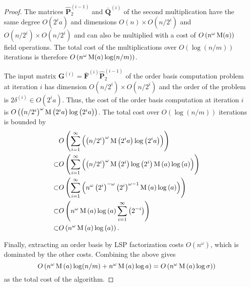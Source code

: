 \begin{proof}
The matrices $\hat{\mathbf{P}}_{2}^{\left(i-1\right)}$ and $\bar{\mathbf{Q}}^{\left(i\right)}$
of the second multiplication have the same degree $O(2^{i}a)$ and
dimensions $O\left(n\right)\times O(n/2^{i})$ and $O(n/2^{i})\times O(n/2^{i})$
and can also be multiplied with a cost of $O\left(n^{\omega}\M(a)\right)$
field operations. The total cost of the multiplications over $O(\log\left(n/m\right))$
iterations is therefore $O\left(n^{\omega}\M(a)\log(n/m)\right)$.

The input matrix $\mathbf{G}^{\left(i\right)}=\bar{\mathbf{F}}^{\left(i\right)}\hat{\mathbf{P}}_{2}^{\left(i-1\right)}$
of the order basis computation problem at iteration $i$ has dimension
$O(n/2^{i})\times O(n/2^{i})$ and the order of the problem is $2\delta^{\left(i\right)}\in O(2^{i}a)$.
Thus, the cost of the order basis computation at iteration $i$ is
$O\left(\left(n/2^{i}\right)^{\omega}\M\left(2^{i}a\right)\log\left(2^{i}a\right)\right)$.
The total cost over $O(\log\left(n/m\right))$ iterations is bounded
by 
\begin{align*}
 & O\left(\sum_{i=1}^{\infty}\left(\left(n/2^{i}\right)^{\omega}\M\left(2^{i}a\right)\log\left(2^{i}a\right)\right)\right)\\
\subset & O\left(\sum_{i=1}^{\infty}\left(\left(n/2^{i}\right)^{\omega}\M\left(2^{i}\right)\log\left(2^{i}\right)\M\left(a\right)\log\left(a\right)\right)\right)\\
\subset & O\left(\sum_{i=1}^{\infty}\left(n^{\omega}\left(2^{i}\right)^{-\omega}\left(2^{i}\right)^{\omega-1}\M\left(a\right)\log\left(a\right)\right)\right)\\
\subset & O\left(n^{\omega}\M\left(a\right)\log\left(a\right)\sum_{i=1}^{\infty}\left(2^{-i}\right)\right)\\
\subset & O\left(n^{\omega}\M\left(a\right)\log\left(a\right)\right).
\end{align*}


Finally, extracting an order basis by LSP factorization costs $O\left(n^{\omega}\right)$,
which is dominated by the other costs. Combining the above gives 
\[
O\left(n^{\omega}\M\left(a\right)\log(n/m)+n^{\omega}\M\left(a\right)\log a\right)=O\left(n^{\omega}\M\left(a\right)\log\sigma)\right)
\]
 as the total cost of the algorithm. \end{proof}

